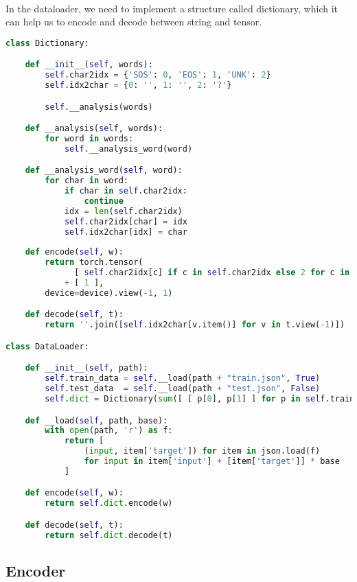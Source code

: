 \paragraph{}
In the dataloader, we need to implement a structure called dictionary, which it can help us to encode and decode between string and tensor.
\begin{lstlisting}[language=Python]
class Dictionary:

    def __init__(self, words):
        self.char2idx = {'SOS': 0, 'EOS': 1, 'UNK': 2}
        self.idx2char = {0: '', 1: '', 2: '?'}

        self.__analysis(words)

    def __analysis(self, words):
        for word in words:
            self.__analysis_word(word)

    def __analysis_word(self, word):
        for char in word:
            if char in self.char2idx:
                continue
            idx = len(self.char2idx)
            self.char2idx[char] = idx
            self.idx2char[idx] = char
        
    def encode(self, w):
        return torch.tensor(
              [ self.char2idx[c] if c in self.char2idx else 2 for c in w ]
            + [ 1 ],
        device=device).view(-1, 1)

    def decode(self, t):
        return ''.join([self.idx2char[v.item()] for v in t.view(-1)])

class DataLoader:

    def __init__(self, path):
        self.train_data = self.__load(path + "train.json", True)
        self.test_data  = self.__load(path + "test.json", False)
        self.dict = Dictionary(sum([ [ p[0], p[1] ] for p in self.train_data], []))

    def __load(self, path, base):
        with open(path, 'r') as f:
            return [ 
                (input, item['target']) for item in json.load(f) 
                for input in item['input'] + [item['target']] * base
            ]

    def encode(self, w):
        return self.dict.encode(w)

    def decode(self, t):
        return self.dict.decode(t)
\end{lstlisting}
\subsection{Encoder}
